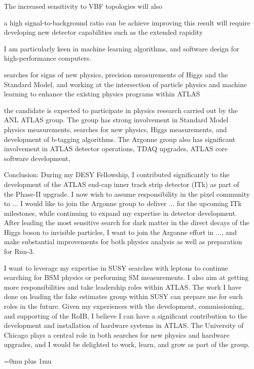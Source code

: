 \documentclass[a4paper]{article}
\begin{document}
The increased sensitivity
to VBF topologies will also

a high signal-to-background ratio can be achieve
improving this result will require developing new detector capabilities such as the extended rapidity

I am particularly keen in machine learning algorithms, and software design for high-performance computers.


searches for signs of new physics, precision measurements of Higgs and the Standard Model, and working at the intersection of particle physics and machine learning to enhance the existing physics programs within ATLAS


the candidate is expected to participate in physics research carried out by the ANL ATLAS group. The group has strong involvement in Standard Model physics measurements, searches for new physics, Higgs measurements, and development of b-tagging algorithms. The Argonne group also has significant involvement in ATLAS detector operations, TDAQ upgrades, ATLAS core software development,


Conclusion:
During my DESY Fellowship, I contributed significantly to the development of the ATLAS end-cap inner track strip detector (ITk) as part of the Phase-II upgrade. I now wish to assume responsibility in the pixel community to ...
I would like to join the Argonne group to deliver ... for the upcoming ITk milestones, while continuing to expand my expertise in detector development.
After leading the most sensitive search for dark matter in the direct decays of the Higgs boson to invisible particles, I want to join the
Argonne effort in ..., and make substantial improvements for both physics analysis as well as preparation for Run-3.


I want to leverage my expertise in SUSY searches with leptons to continue searching for BSM physics or performing SM measurements. I also
aim at getting more responsibilities and take leadership roles within ATLAS. The work I have done on
leading the fake estimates group within SUSY can prepare me for such roles in the future.
Given my experiences with the development, commissioning, and supporting of the RoIB, I believe I can have a
significant contribution to the development and installation of hardware systems in ATLAS.
The University of Chicago plays a central role in both searches for new physics and hardware upgrades, and I would be delighted to work,
learn, and grow as part of the group.





\Urlmuskip=0mu plus 1mu\relax
{%
\fontsize{9}{4}
\selectfont
}{}

\end{document}
